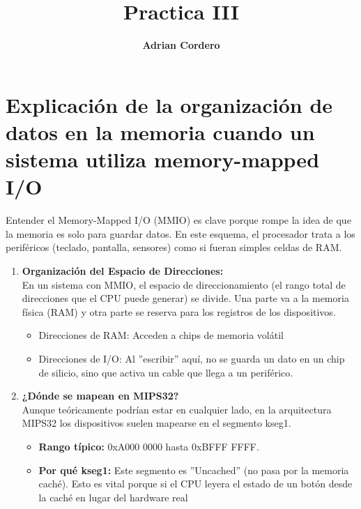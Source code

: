 \documentclass[]{article}
\title{\Huge {\textbf{Practica III}}}
\author{\LARGE  {\textbf{Adrian Cordero}}}
\begin{document}
\maketitle
\newpage

\section{Explicación de la organización de datos en la memoria cuando un sistema utiliza memory-mapped 
	I/O }
	
	Entender el Memory-Mapped I/O (MMIO) es clave porque rompe la idea de que la memoria es solo para guardar datos. En este esquema, el procesador trata a los periféricos (teclado, pantalla, sensores) como si fueran simples celdas de RAM.
	
	\begin{enumerate}
		\item \textbf{Organización del Espacio de Direcciones:}\\
			En un sistema con MMIO, el espacio de direccionamiento (el rango total de direcciones que el CPU puede generar) se divide. Una parte va a la memoria física (RAM) y otra parte se reserva para los registros de los dispositivos.
			\begin{itemize}
				\item Direcciones de RAM: Acceden a chips de memoria volátil
				\item Direcciones de I/O: Al ''escribir'' aquí, no se guarda un dato en un chip de silicio, sino que activa un cable que llega a un periférico.
			\end{itemize}
			
		\item  \textbf{¿Dónde se mapean en MIPS32?}\\
			Aunque teóricamente podrían estar en cualquier lado, en la arquitectura MIPS32 los dispositivos suelen mapearse en el segmento kseg1.
			\begin{itemize}
				\item \textbf{Rango típico:} 0xA000 0000 hasta 0xBFFF FFFF.
				\item \textbf{Por qué kseg1:} Este segmento es ''Uncached'' (no pasa por la memoria caché). Esto es vital porque si el CPU leyera el estado de un botón desde la caché en lugar del hardware real
			\end{itemize}
	\end{enumerate}
	
\end{document}

